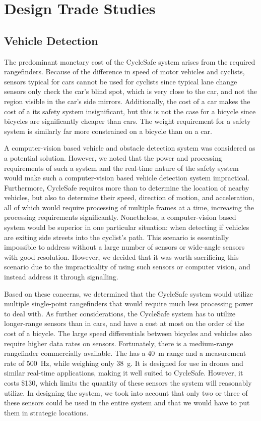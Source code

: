 \documentclass[journal]{IEEEtran}
\begin{document}
\section{Design Trade Studies}

\subsection{Vehicle Detection}
The predominant monetary cost of the CycleSafe system arises from the required rangefinders. Because of the difference in speed of motor vehicles and cyclists, sensors typical for cars cannot be used for cyclists since typical lane change sensors only check the car's blind spot, which is very close to the car, and not the region visible in the car's side mirrors. Additionally, the cost of a car makes the cost of a its safety system insignificant, but this is not the case for a bicycle since bicycles are significantly cheaper than cars. The weight requirement for a safety system is similarly far more constrained on a bicycle than on a car.

A computer-vision based vehicle and obstacle detection system was considered as a potential solution. However, we noted that the power and processing requirements of such a system and the real-time nature of the safety system would make such a computer-vision based vehicle detection system impractical. Furthermore, CycleSafe requires more than to determine the location of nearby vehicles, but also to determine their speed, direction of motion, and acceleration, all of which would require processing of multiple frames at a time, increasing the processing requirements significantly. Nonetheless, a computer-vision based system would be superior in one particular situation: when detecting if vehicles are exiting side streets into the cyclist's path. This scenario is essentially impossible to address without a large number of sensors or wide-angle sensors with good resolution. However, we decided that it was worth sacrificing this scenario due to the impracticality of using such sensors or computer vision, and instead address it through signalling.

Based on these concerns, we determined that the CycleSafe system would utilize multiple single-point rangefinders that would require much less processing power to deal with. As further considerations, the CycleSafe system has to utilize longer-range sensors than in cars, and have a cost at most on the order of the cost of a bicycle. The large speed differentials between bicycles and vehicles also require higher data rates on sensors. Fortunately, there is a medium-range rangefinder commercially available. The \lidar{} has a \SI{40}{\meter} range and a measurement rate of \SI{500}{\Hz}, while weighing only \SI{38}{\gram}. It is designed for use in drones and similar real-time applications, making it well suited to CycleSafe. However, it costs \$130, which limits the quantity of these sensors the system will reasonably utilize. In designing the system, we took into account that only two or three of these sensors could be used in the entire system and that we would have to put them in strategic locations.
\end{document}
